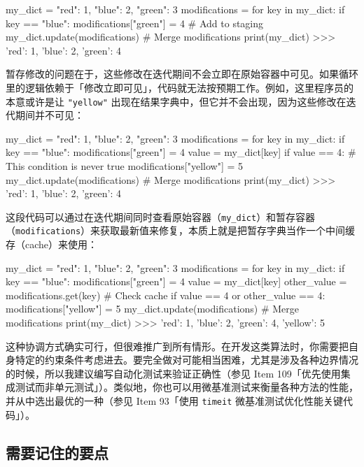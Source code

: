 \begin{codebox}[python]
my_dict = {"red": 1, "blue": 2, "green": 3}
modifications = {}
for key in my_dict:
    if key == "blue":
        modifications["green"] = 4  # Add to staging
my_dict.update(modifications)       # Merge modifications
print(my_dict)
>>>
{'red': 1, 'blue': 2, 'green': 4}
\end{codebox}

暂存修改的问题在于，这些修改在迭代期间不会立即在原始容器中可见。如果循环里的逻辑依赖于「修改立即可见」，代码就无法按预期工作。例如，这里程序员的本意或许是让 \texttt{"yellow"} 出现在结果字典中，但它并不会出现，因为这些修改在迭代期间并不可见：

\begin{codebox}[python]
my_dict = {"red": 1, "blue": 2, "green": 3}
modifications = {}
for key in my_dict:
    if key == "blue":
        modifications["green"] = 4
    value = my_dict[key]
    if value == 4:               # This condition is never true
        modifications["yellow"] = 5
my_dict.update(modifications)    # Merge modifications
print(my_dict)
>>>
{'red': 1, 'blue': 2, 'green': 4}
\end{codebox}

这段代码可以通过在迭代期间同时查看原始容器（\texttt{my\_dict}）和暂存容器（\texttt{modifications}）来获取最新值来修复，本质上就是把暂存字典当作一个中间缓存（cache）来使用：

\begin{codebox}[python]
my_dict = {"red": 1, "blue": 2, "green": 3}
modifications = {}
for key in my_dict:
    if key == "blue":
        modifications["green"] = 4
    value = my_dict[key]
    other_value = modifications.get(key)  # Check cache
    if value == 4 or other_value == 4:
        modifications["yellow"] = 5
my_dict.update(modifications)             # Merge modifications
print(my_dict)
>>>
{'red': 1, 'blue': 2, 'green': 4, 'yellow': 5}
\end{codebox}

这种协调方式确实可行，但很难推广到所有情形。在开发这类算法时，你需要把自身特定的约束条件考虑进去。要完全做对可能相当困难，尤其是涉及各种边界情况的时候，所以我建议编写自动化测试来验证正确性（参见 Item 109「优先使用集成测试而非单元测试」）。类似地，你也可以用微基准测试来衡量各种方法的性能，并从中选出最优的一种（参见 Item 93「使用 \texttt{timeit} 微基准测试优化性能关键代码」）。

\subsection{需要记住的要点}


